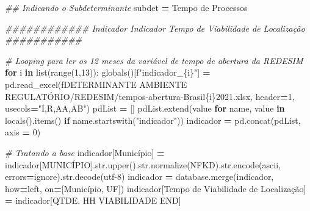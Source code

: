 \documentclass[
  12,
  dvipsnames]{article}
\newenvironment{Shaded}{\begin{snugshade}}{\end{snugshade}}
\newcommand{\BuiltInTok}[1]{#1}
\newcommand{\CommentTok}[1]{\textcolor[rgb]{0.56,0.35,0.01}{\textit{#1}}}
\newcommand{\ControlFlowTok}[1]{\textcolor[rgb]{0.13,0.29,0.53}{\textbf{#1}}}
\newcommand{\DecValTok}[1]{\textcolor[rgb]{0.00,0.00,0.81}{#1}}
\newcommand{\KeywordTok}[1]{\textcolor[rgb]{0.13,0.29,0.53}{\textbf{#1}}}
\newcommand{\NormalTok}[1]{#1}
\newcommand{\OperatorTok}[1]{\textcolor[rgb]{0.81,0.36,0.00}{\textbf{#1}}}
\newcommand{\SpecialCharTok}[1]{\textcolor[rgb]{0.00,0.00,0.00}{#1}}
\newcommand{\SpecialStringTok}[1]{\textcolor[rgb]{0.31,0.60,0.02}{#1}}
\newcommand{\StringTok}[1]{\textcolor[rgb]{0.31,0.60,0.02}{#1}}
\begin{document}
\begin{Shaded}
\begin{Highlighting}[]
\CommentTok{\#\# Indicando o Subdeterminante}
\NormalTok{subdet }\OperatorTok{=} \StringTok{\textquotesingle{}Tempo de Processos\textquotesingle{}}

\CommentTok{\#\#\#\#\#\#\#\#\#\#\#\# Indicador Indicador Tempo de Viabilidade de Localização \#\#\#\#\#\#\#\#\#\#\#}

\CommentTok{\# Looping para ler os 12 meses da variável de tempo de abertura da REDESIM}
\ControlFlowTok{for}\NormalTok{ i }\KeywordTok{in} \BuiltInTok{list}\NormalTok{(}\BuiltInTok{range}\NormalTok{(}\DecValTok{1}\NormalTok{,}\DecValTok{13}\NormalTok{)):}
    \BuiltInTok{globals}\NormalTok{()[}\SpecialStringTok{f"indicador\_}\SpecialCharTok{\{}\NormalTok{i}\SpecialCharTok{\}}\SpecialStringTok{"}\NormalTok{] }\OperatorTok{=}\NormalTok{ pd.read\_excel(}\SpecialStringTok{f\textquotesingle{}DETERMINANTE AMBIENTE REGULATÓRIO/REDESIM/tempos{-}abertura{-}Brasil}\SpecialCharTok{\{}\NormalTok{i}\SpecialCharTok{\}}\SpecialStringTok{2021.xlsx\textquotesingle{}}\NormalTok{, }
\NormalTok{                                                    header}\OperatorTok{=}\DecValTok{1}\NormalTok{, usecols}\OperatorTok{=}\StringTok{"I,R,AA,AB"}\NormalTok{)}
\NormalTok{    pdList }\OperatorTok{=}\NormalTok{ []}
\NormalTok{    pdList.extend(value }\ControlFlowTok{for}\NormalTok{ name, value }\KeywordTok{in} \BuiltInTok{locals}\NormalTok{().items() }\ControlFlowTok{if}\NormalTok{ name.startswith(}\StringTok{"indicador"}\NormalTok{))}
\NormalTok{    indicador }\OperatorTok{=}\NormalTok{ pd.concat(pdList, axis }\OperatorTok{=} \DecValTok{0}\NormalTok{)}

\CommentTok{\# Tratando a base}
\NormalTok{indicador[}\StringTok{\textquotesingle{}Município\textquotesingle{}}\NormalTok{] }\OperatorTok{=}\NormalTok{ indicador[}\StringTok{\textquotesingle{}MUNICÍPIO\textquotesingle{}}\NormalTok{].}\BuiltInTok{str}\NormalTok{.upper().}\BuiltInTok{str}\NormalTok{.normalize(}\StringTok{\textquotesingle{}NFKD\textquotesingle{}}\NormalTok{).}\BuiltInTok{str}\NormalTok{.encode(}\StringTok{\textquotesingle{}ascii\textquotesingle{}}\NormalTok{, errors}\OperatorTok{=}\StringTok{\textquotesingle{}ignore\textquotesingle{}}\NormalTok{).}\BuiltInTok{str}\NormalTok{.decode(}\StringTok{\textquotesingle{}utf{-}8\textquotesingle{}}\NormalTok{)}
\NormalTok{indicador }\OperatorTok{=}\NormalTok{ database.merge(indicador, how}\OperatorTok{=}\StringTok{\textquotesingle{}left\textquotesingle{}}\NormalTok{, on}\OperatorTok{=}\NormalTok{[}\StringTok{\textquotesingle{}Município\textquotesingle{}}\NormalTok{, }\StringTok{\textquotesingle{}UF\textquotesingle{}}\NormalTok{])}
\NormalTok{indicador[}\StringTok{\textquotesingle{}Tempo de Viabilidade de Localização\textquotesingle{}}\NormalTok{] }\OperatorTok{=}\NormalTok{ indicador[}\StringTok{\textquotesingle{}QTDE.  HH VIABILIDADE END\textquotesingle{}}\NormalTok{]}


\end{Highlighting}
\end{Shaded}
\end{document}
